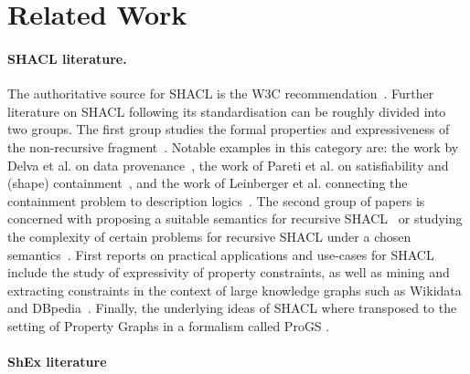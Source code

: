 \section{Related Work}

\paragraph{SHACL literature.} The authoritative source for SHACL is the W3C recommendation~\cite{KK17}.
Further literature on SHACL following its standardisation can be roughly divided into two groups. The first group studies the formal properties and expressiveness of the non-recursive fragment~\cite{BJVdB24}. Notable examples in this category are: the work by Delva et al. on data provenance~\cite{DDJB23}, the work of Pareti et al. on satisfiability and (shape) containment~\cite{PKMN20}, and the work of Leinberger et al. connecting the containment problem to description logics~\cite{LSRLS20}.
The second group of papers is concerned with proposing a suitable semantics for recursive SHACL~\cite{CRS18,CFRS19,ACORSS20,BJ21} or studying the complexity of certain problems for recursive SHACL under a chosen semantics~\cite{PKM22}. First reports on practical applications and use-cases for SHACL include the study of expressivity of property constraints, as well as  mining and extracting constraints in the context of large knowledge graphs such as Wikidata and DBpedia~\cite{FSAP24,RLH23}. Finally, the underlying ideas of SHACL where transposed to the setting of Property Graphs in a formalism called ProGS \cite{ProGS}.

\paragraph{ShEx literature}

